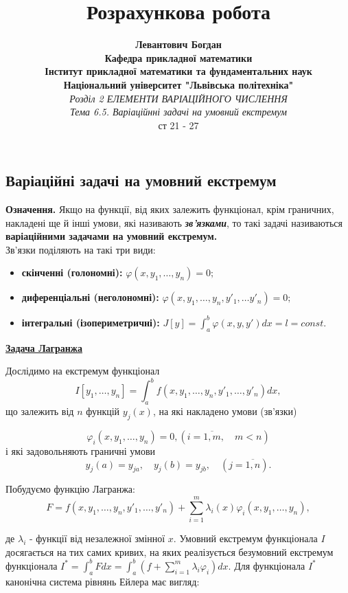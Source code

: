\documentclass[12pt,a4paper]{article}
\title{Розрахункова робота}
\author{
 \textbf{Левантович Богдан}
 \\\textbf{Кафедра прикладної математики}
 \\\textbf{Інститут прикладної математики та фундаментальних наук}
 \\\textbf{Національний університет "Львівська політехніка"}
\\\emph{Розділ 2 ЕЛЕМЕНТИ ВАРІАЦІЙНОГО ЧИСЛЕННЯ}
\\\emph{Тема 6.5. Варіаційнні задачі на умовний екстремум}
 \\\textcolor[rgb]{0.00,1.00,0.25}{ст 21 - 27}     
}
\date{}
\begin{document}
\maketitle
	\newpage
	\subsection{Варіаційні задачі на умовний екстремум}

	\textbf{Означення.} Якщо на функції, від яких залежить функціонал, крім граничних, накладені ще й інші умови,
	які називають \textbf{\textit{зв’язками}}, то такі задачі називаються \textbf{варіаційними задачами на умовний екстремум.} \\
	Зв’язки поділяють на такі три види: 
	\begin{itemize}
		\item \textbf{скінченні (голономні):} $\varphi(x, y_1,\ldots, y_n) = 0;$

		\item \textbf{диференціальні (неголономні):}
			$\varphi(x, y_1, \ldots, y_n, y'_1, \ldots y'_n) = 0;$

		\item \textbf{інтегральні (ізопериметричні):} 
			$J[y] = \int_{a}^{b} \varphi(x, y, y')dx = l = const$.
	\end{itemize}

	\begin{center}
		\underline{\textbf{Задача Лагранжа}}
	\end{center}

	Дослідимо на екстремум функціонал
	\begin{equation}
		I[y_1, \ldots, y_n] = \int_{a}^{b} f(x, y_1, \ldots, y_n, y'_1, \ldots, y'_n)dx,
	\end{equation}
	що залежить від $n$ функцій $y_j(x)$, на які накладено умови (зв’язки)
	
	$$\varphi_i(x, y_1, \ldots, y_n) = 0, (i = \overline{1,m}, \quad m < n)$$
	і які задовольняють граничні умови
	$$y_j(a) = y_{ja}, \quad y_j(b) = y_{jb}, \quad (j=\overline{1,n}).$$
	
	Побудуємо функцію Лагранжа:
	\begin{equation}
		F = f(x, y_1, \ldots, y_n, y'_1, \ldots, y'_n) + 
		\sum_{i=1}^{m} \lambda_i(x) \varphi_i(x, y_1, \ldots, y_n),    			
	\end{equation}				      

	де $\lambda_i$ - функції від незалежної змінної $x$. Умовний екстремум функціонала $I$
	досягається на тих самих кривих, на яких реалізується безумовний екстремум функціонала
	$I^{*} = \int_{a}^{b} Fdx = \int_{a}^{b} \left(f + \sum_{i=1}^{m} \lambda_i \varphi_i \right)dx$.
	Для функціонала $I^{*}$ канонічна система рівнянь Ейлера має вигляд:
	
\end{document}
